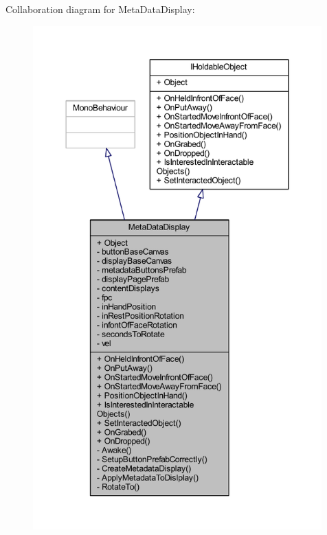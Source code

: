 Collaboration diagram for Meta\+Data\+Display\+:\nopagebreak
\begin{figure}[H]
\begin{center}
\leavevmode
\includegraphics[height=550pt]{class_meta_data_display__coll__graph}
\end{center}
\end{figure}

